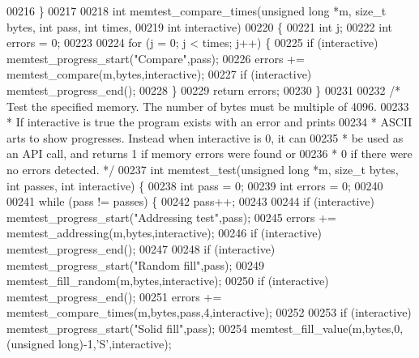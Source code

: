 \begin{DoxyCode}
{{{{00216 \}
00217 
00218 \textcolor{keywordtype}{int} memtest\_compare\_times(\textcolor{keywordtype}{unsigned} \textcolor{keywordtype}{long} *m, size\_t bytes, \textcolor{keywordtype}{int} pass, \textcolor{keywordtype}{int} times,
00219                           \textcolor{keywordtype}{int} interactive)
00220 \{
00221     \textcolor{keywordtype}{int} j;
00222     \textcolor{keywordtype}{int} errors = 0;
00223 
00224     \textcolor{keywordflow}{for} (j = 0; j < times; j++) \{
00225         \textcolor{keywordflow}{if} (interactive) memtest\_progress\_start(\textcolor{stringliteral}{"Compare"},pass);
00226         errors += memtest\_compare(m,bytes,interactive);
00227         \textcolor{keywordflow}{if} (interactive) memtest\_progress\_end();
00228     \}
00229     \textcolor{keywordflow}{return} errors;
00230 \}
00231 
00232 \textcolor{comment}{/* Test the specified memory. The number of bytes must be multiple of 4096.}
00233 \textcolor{comment}{ * If interactive is true the program exists with an error and prints}
00234 \textcolor{comment}{ * ASCII arts to show progresses. Instead when interactive is 0, it can}
00235 \textcolor{comment}{ * be used as an API call, and returns 1 if memory errors were found or}
00236 \textcolor{comment}{ * 0 if there were no errors detected. */}
00237 \textcolor{keywordtype}{int} memtest\_test(\textcolor{keywordtype}{unsigned} \textcolor{keywordtype}{long} *m, size\_t bytes, \textcolor{keywordtype}{int} passes, \textcolor{keywordtype}{int} interactive) \{
00238     \textcolor{keywordtype}{int} pass = 0;
00239     \textcolor{keywordtype}{int} errors = 0;
00240 
00241     \textcolor{keywordflow}{while} (pass != passes) \{
00242         pass++;
00243 
00244         \textcolor{keywordflow}{if} (interactive) memtest\_progress\_start(\textcolor{stringliteral}{"Addressing test"},pass);
00245         errors += memtest\_addressing(m,bytes,interactive);
00246         \textcolor{keywordflow}{if} (interactive) memtest\_progress\_end();
00247 
00248         \textcolor{keywordflow}{if} (interactive) memtest\_progress\_start(\textcolor{stringliteral}{"Random fill"},pass);
00249         memtest\_fill\_random(m,bytes,interactive);
00250         \textcolor{keywordflow}{if} (interactive) memtest\_progress\_end();
00251         errors += memtest\_compare\_times(m,bytes,pass,4,interactive);
00252 
00253         \textcolor{keywordflow}{if} (interactive) memtest\_progress\_start(\textcolor{stringliteral}{"Solid fill"},pass);
00254         memtest\_fill\_value(m,bytes,0,(\textcolor{keywordtype}{unsigned} \textcolor{keywordtype}{long})-1,\textcolor{stringliteral}{'S'},interactive);
}}}}
\end{DoxyCode}
